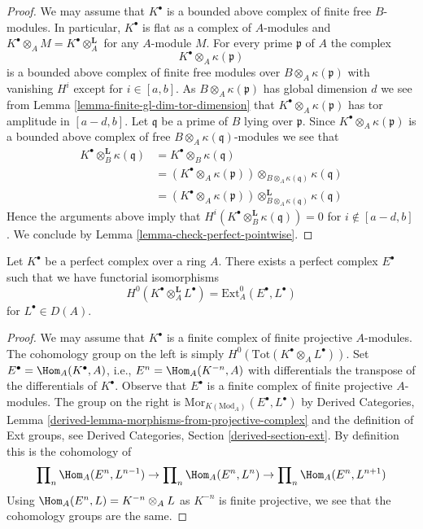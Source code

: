 \begin{proof}
We may assume that $K^\bullet$ is a bounded above complex of
finite free $B$-modules. In particular, $K^\bullet$ is flat as a
complex of $A$-modules and
$K^\bullet \otimes_A M = K^\bullet \otimes_A^{\mathbf{L}}$ for any
$A$-module $M$. For every prime $\mathfrak p$ of $A$ the complex
$$
K^\bullet \otimes_A \kappa(\mathfrak p)
$$
is a bounded above complex of finite free modules over
$B \otimes_A \kappa(\mathfrak p)$ with vanishing $H^i$ except
for $i \in [a, b]$. As $B \otimes_A \kappa(\mathfrak p)$
has global dimension $d$ we see from
Lemma \ref{lemma-finite-gl-dim-tor-dimension}
that $K^\bullet \otimes_A \kappa(\mathfrak p)$ has tor amplitude in
$[a - d, b]$. Let $\mathfrak q$ be a prime of $B$ lying over $\mathfrak p$.
Since $K^\bullet \otimes_A \kappa(\mathfrak p)$ is a bounded above
complex of free $B \otimes_A \kappa(\mathfrak q)$-modules we see
that
\begin{align*}
K^\bullet \otimes_B^{\mathbf{L}} \kappa(\mathfrak q)
& = K^\bullet \otimes_B \kappa(\mathfrak q) \\
& = (K^\bullet \otimes_A \kappa(\mathfrak p))
\otimes_{B \otimes_A \kappa(\mathfrak q)} \kappa(\mathfrak q) \\
& = (K^\bullet \otimes_A \kappa(\mathfrak p))
\otimes^{\mathbf{L}}_{B \otimes_A \kappa(\mathfrak q)} \kappa(\mathfrak q)
\end{align*}
Hence the arguments above imply that
$H^i(K^\bullet \otimes_B^{\mathbf{L}} \kappa(\mathfrak q)) = 0$
for $i \not \in [a - d, b]$. We conclude by
Lemma \ref{lemma-check-perfect-pointwise}.
\end{proof}

\begin{lemma}
\label{lemma-dual-perfect-complex}
Let $K^\bullet$ be a perfect complex over a ring $A$. There exists a
perfect complex $E^\bullet$ such that we have functorial isomorphisms
$$
H^0(K^\bullet \otimes_A^\mathbf{L} L^\bullet) =
\text{Ext}_A^0(E^\bullet, L^\bullet)
$$
for $L^\bullet \in D(A)$.
\end{lemma}

\begin{proof}
We may assume that $K^\bullet$ is a finite complex of finite projective
$A$-modules. The cohomology group on the left is simply
$H^0(\text{Tot}(K^\bullet \otimes_A L^\bullet))$. Set
$E^\bullet = \Hom_A(K^\bullet, A)$, i.e., $E^n = \Hom_A(K^{-n}, A)$
with differentials the transpose of the differentials of $K^\bullet$.
Observe that $E^\bullet$ is a finite complex of finite projective $A$-modules.
The group on the right
is $\text{Mor}_{K(\text{Mod}_A)}(E^\bullet, L^\bullet)$ by
Derived Categories, Lemma \ref{derived-lemma-morphisms-from-projective-complex}
and the definition of Ext groups, see
Derived Categories, Section \ref{derived-section-ext}.
By definition this is the cohomology of
$$
\prod\nolimits_n \Hom_A(E^n, L^{n - 1})
\to
\prod\nolimits_n \Hom_A(E^n, L^n)
\to
\prod\nolimits_n \Hom_A(E^n, L^{n + 1})
$$
Using $\Hom_A(E^n, L) = K^{-n} \otimes_A L$ as $K^{-n}$ is finite
projective, we see that the cohomology groups are the same.
\end{proof}





